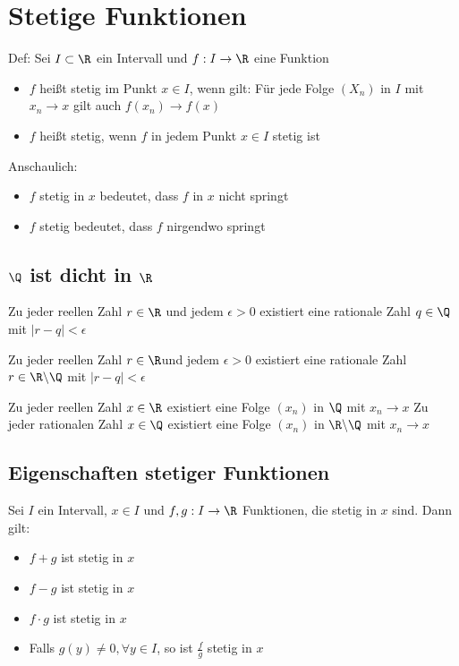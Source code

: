 \section{Stetige Funktionen}
	\begin{Definition}[ Stetig]
		Def: \newline
	Sei $I\subset \R$ ein Intervall und $f: I \to \R$ eine Funktion
	\begin{itemize}
		\item $f$ heißt stetig im Punkt $x\in I$, wenn gilt: \newline
			Für jede Folge $(X_n)$ in $I$ mit $x_n\to x$ gilt auch $f(x_n)\to f(x)$
		\item $f$ heißt stetig, wenn $f$ in jedem Punkt $x \in I$ stetig ist
	\end{itemize}
	\end{Definition}
	Anschaulich:
	\begin{itemize}
		\item \glqq{} $f$ stetig in $x$ \grqq{}  bedeutet, dass $f$ in $x$ nicht springt
		\item \glqq{} $f$ stetig \grqq{} bedeutet, dass $f$ nirgendwo springt 
	\end{itemize}
	\subsection{$\Q$ ist dicht in $\R$}
		\begin{Lemma}[ ]
			Zu jeder reellen Zahl $r\in \R$ und jedem $\epsilon > 0$ existiert eine rationale Zahl $q\in \Q$ mit $|r-q|<\epsilon$
		\end{Lemma}
		\begin{Lemma} [ ]
			Zu jeder reellen Zahl $r\in \R$und jedem $\epsilon>0$ existiert eine rationale Zahl $r\in\R\backslash\Q$ mit $|r-q|<\epsilon$
		\end{Lemma}
		\begin{Lemma} [ ]
			Zu jeder reellen Zahl $x\in\R$ existiert eine Folge $(x_n)$ in $\Q$ mit $x_n\to x$\newline
			Zu jeder rationalen Zahl $x\in \Q$ existiert eine Folge $(x_n)$ in $\R\backslash\Q$ mit $x_n\to x$
		\end{Lemma}
	\subsection{Eigenschaften stetiger Funktionen}
		\begin{Satz} [ ]
			Sei $I$ ein Intervall, $x \in I$ und $f, g: I\to \R$ Funktionen, die stetig in $x$ sind. Dann gilt:
			\begin{itemize}
				\item $f+g$ ist stetig in $x$
				\item $f-g$ ist stetig in $x$
				\item $f\cdot g$ ist stetig in $x$
				\item Falls $g(y)\not = 0, \forall y\in I$, so ist $\frac{f}{g}$ stetig in $x$
			\end{itemize}
		\end{Satz}

